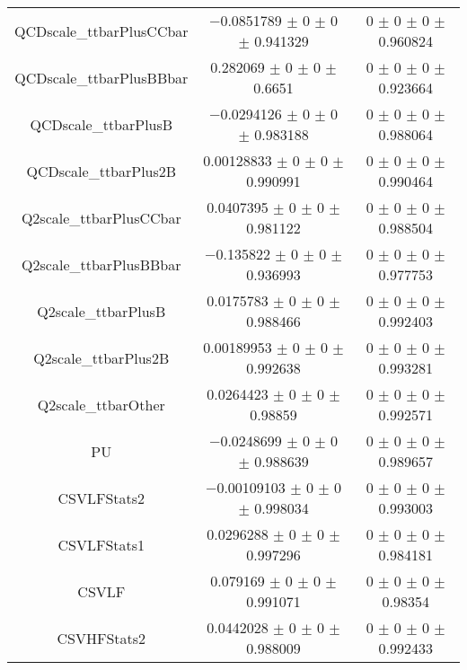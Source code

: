 \begin{table}
\begin{tabular}{ccc}
QCDscale\_ttbarPlusCCbar 	& \num{-0.0851789} $\pm$ \num{0} $\pm$ \num{0} $\pm$ \num{0.941329} 	& \num{0} $\pm$ \num{0} $\pm$ \num{0} $\pm$ \num{0.960824}\\
QCDscale\_ttbarPlusBBbar 	& \num{0.282069} $\pm$ \num{0} $\pm$ \num{0} $\pm$ \num{0.6651} 	& \num{0} $\pm$ \num{0} $\pm$ \num{0} $\pm$ \num{0.923664}\\
QCDscale\_ttbarPlusB 	& \num{-0.0294126} $\pm$ \num{0} $\pm$ \num{0} $\pm$ \num{0.983188} 	& \num{0} $\pm$ \num{0} $\pm$ \num{0} $\pm$ \num{0.988064}\\
QCDscale\_ttbarPlus2B 	& \num{0.00128833} $\pm$ \num{0} $\pm$ \num{0} $\pm$ \num{0.990991} 	& \num{0} $\pm$ \num{0} $\pm$ \num{0} $\pm$ \num{0.990464}\\
Q2scale\_ttbarPlusCCbar 	& \num{0.0407395} $\pm$ \num{0} $\pm$ \num{0} $\pm$ \num{0.981122} 	& \num{0} $\pm$ \num{0} $\pm$ \num{0} $\pm$ \num{0.988504}\\
Q2scale\_ttbarPlusBBbar 	& \num{-0.135822} $\pm$ \num{0} $\pm$ \num{0} $\pm$ \num{0.936993} 	& \num{0} $\pm$ \num{0} $\pm$ \num{0} $\pm$ \num{0.977753}\\
Q2scale\_ttbarPlusB 	& \num{0.0175783} $\pm$ \num{0} $\pm$ \num{0} $\pm$ \num{0.988466} 	& \num{0} $\pm$ \num{0} $\pm$ \num{0} $\pm$ \num{0.992403}\\
Q2scale\_ttbarPlus2B 	& \num{0.00189953} $\pm$ \num{0} $\pm$ \num{0} $\pm$ \num{0.992638} 	& \num{0} $\pm$ \num{0} $\pm$ \num{0} $\pm$ \num{0.993281}\\
Q2scale\_ttbarOther 	& \num{0.0264423} $\pm$ \num{0} $\pm$ \num{0} $\pm$ \num{0.98859} 	& \num{0} $\pm$ \num{0} $\pm$ \num{0} $\pm$ \num{0.992571}\\
PU 	& \num{-0.0248699} $\pm$ \num{0} $\pm$ \num{0} $\pm$ \num{0.988639} 	& \num{0} $\pm$ \num{0} $\pm$ \num{0} $\pm$ \num{0.989657}\\
CSVLFStats2 	& \num{-0.00109103} $\pm$ \num{0} $\pm$ \num{0} $\pm$ \num{0.998034} 	& \num{0} $\pm$ \num{0} $\pm$ \num{0} $\pm$ \num{0.993003}\\
CSVLFStats1 	& \num{0.0296288} $\pm$ \num{0} $\pm$ \num{0} $\pm$ \num{0.997296} 	& \num{0} $\pm$ \num{0} $\pm$ \num{0} $\pm$ \num{0.984181}\\
CSVLF 	& \num{0.079169} $\pm$ \num{0} $\pm$ \num{0} $\pm$ \num{0.991071} 	& \num{0} $\pm$ \num{0} $\pm$ \num{0} $\pm$ \num{0.98354}\\
CSVHFStats2 	& \num{0.0442028} $\pm$ \num{0} $\pm$ \num{0} $\pm$ \num{0.988009} 	& \num{0} $\pm$ \num{0} $\pm$ \num{0} $\pm$ \num{0.992433}\\

\end{tabular}
\end{table}
